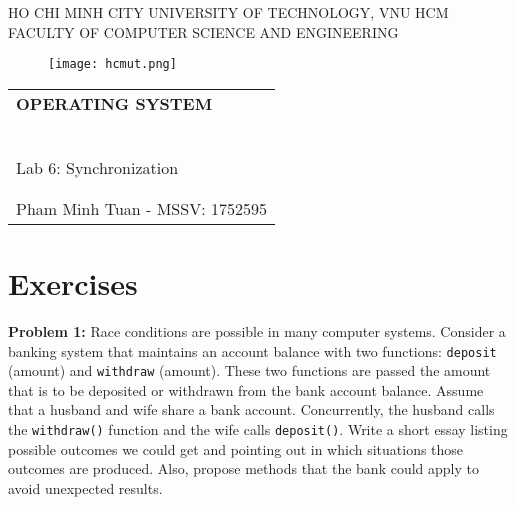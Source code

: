\documentclass[a4paper]{article}
\begin{document}
    \begin{titlepage}
        \begin{center}
            HO CHI MINH CITY UNIVERSITY OF TECHNOLOGY, VNU HCM \\
            FACULTY OF COMPUTER SCIENCE AND ENGINEERING
        \end{center}

        \vspace{1cm}

        \begin{figure}[h!]
            \begin{center}
                \texttt{[image: hcmut.png]}
            \end{center}
        \end{figure}

        \vspace{1cm}

        \begin{center}
            \begin{tabular}{c}
                \multicolumn{1}{l}{\textbf{\LARGE OPERATING SYSTEM}} \\
                ~~\\
                \hline
                \\
                \multicolumn{1}{l}{\LARGE Lab 6: Synchronization} \\
                \\
                \hline
                \\
                \hspace{5cm} Pham Minh Tuan - MSSV: 1752595
            \end{tabular}
        \end{center}
    \end{titlepage}

\newpage

\section{Exercises}

\textbf{Problem 1:} Race conditions are possible in many computer systems. Consider a banking system that
maintains an account balance with two functions: \texttt{deposit} (amount) and \texttt{withdraw} (amount). These
two functions are passed the amount that is to be deposited or withdrawn from the bank account balance.
Assume that a husband and wife share a bank account. Concurrently, the husband calls the \texttt{withdraw()}
function and the wife calls \texttt{deposit()}. Write a short essay listing possible outcomes we could get and
pointing out in which situations those outcomes are produced. Also, propose methods that the bank could
apply to avoid unexpected results. \\
\end{document}
